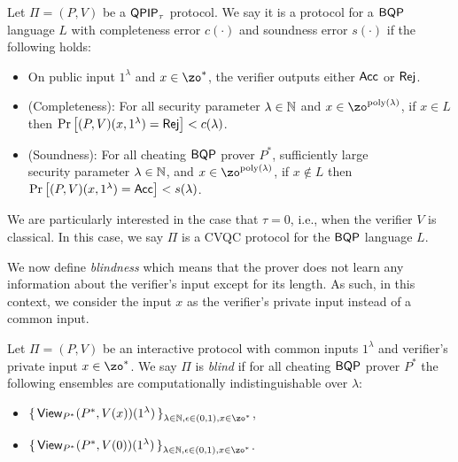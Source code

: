 \begin{definition}
    Let $\Pi=(P, V)$ be a $\operatorname{\mathsf{QPIP}}_\tau$ protocol.
    We say it is a protocol for a $\operatorname{\mathsf{BQP}}$ language $L$ with completeness error $c(\cdot)$ and soundness error $s(\cdot)$ if the following holds:
\begin{itemize}
        \item On public input $1^\lambda$ and $x\in\zo^*$, the verifier outputs either $\mathsf{Acc}$ or $\mathsf{Rej}$.
        \item (Completeness): For all security parameter $\lambda\in\mathbb{N}$ and $x\in\zo^{\poly(\lambda)}$, if $x\in L$ then
        $\Pr\left[(P, V)(x, 1^\lambda)=\mathsf{Rej}\right]<c(\lambda)$.
        \item (Soundness): For all cheating $\operatorname{\mathsf{BQP}}$ prover $P^*$, sufficiently large \\security parameter $\lambda\in\mathbb{N}$, and $x\in\zo^{\poly(\lambda)}$, if $x \notin L$ then \\$\Pr\left[(P, V)(x, 1^\lambda)=\mathsf{Acc}\right]<s(\lambda)$.
    \end{itemize}
\end{definition}

We are particularly interested in the case that $\tau = 0$, i.e., when the verifier $V$ is classical. In this case, we say $\Pi$ is a CVQC protocol for the $\operatorname{\mathsf{BQP}}$ language $L$.

We now define \emph{blindness} which means that the prover does not learn any information about the verifier's input except for its length.
As such, in this context, we consider the input $x$ as the verifier's private input instead of a common input.  

\begin{definition}[Blindness]
    Let $\Pi=(P, V)$ be an interactive protocol with common inputs $1^\lambda$ 
    and verifier's private input $x\in\zo^*$.
    We say $\Pi$ is \emph{blind} if for all cheating $\operatorname{\mathsf{BQP}}$ prover $P^*$ the following ensembles are computationally indistinguishable over $\lambda$:
    \begin{itemize}
        \item $\set{\View_{P^*}(P^*, V(x))(1^\lambda)}_{\lambda\in\bbN, \eps\in(0,1), x\in\zo^*}$,
        \item $\set{\View_{P^*}(P^*, V(0))(1^\lambda)}_{\lambda\in\bbN, \eps\in(0,1), x\in\zo^*}$.
    \end{itemize}
\end{definition}

